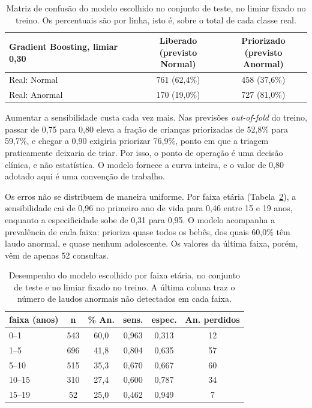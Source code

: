 \documentclass[conference]{IEEEtran}
\begin{document}
\begin{table}[!t]
\caption{Matriz de confusão do modelo escolhido no conjunto de teste, no limiar fixado no treino. Os percentuais são por linha, isto é, sobre o total de cada classe real.}
\label{tab:confusao}
\centering
\footnotesize
\begin{tabular}{>{\raggedright\arraybackslash}p{2.3cm}cc}
\toprule
Gradient Boosting, limiar 0,30 & \shortstack{Liberado\\(previsto Normal)} & \shortstack{Priorizado\\(previsto Anormal)} \\
\midrule
Real: Normal & 761 (62,4\%) & 458 (37,6\%) \\
Real: Anormal & 170 (19,0\%) & 727 (81,0\%) \\
\bottomrule
\end{tabular}
\end{table}

Aumentar a sensibilidade custa cada vez mais. Nas previsões \textit{out-of-fold} do treino, passar de 0,75 para 0,80 eleva a fração de crianças priorizadas de 52,8\% para 59,7\%, e chegar a 0,90 exigiria priorizar 76,9\%, ponto em que a triagem praticamente deixaria de triar. Por isso, o ponto de operação é uma decisão clínica, e não estatística. O modelo fornece a curva inteira, e o valor de 0,80 adotado aqui é uma convenção de trabalho.

Os erros não se distribuem de maneira uniforme. Por faixa etária (Tabela~\ref{tab:faixa}), a sensibilidade cai de 0,96 no primeiro ano de vida para 0,46 entre 15 e 19 anos, enquanto a especificidade sobe de 0,31 para 0,95. O modelo acompanha a prevalência de cada faixa: prioriza quase todos os bebês, dos quais 60,0\% têm laudo anormal, e quase nenhum adolescente. Os valores da última faixa, porém, vêm de apenas 52 consultas.

\begin{table}[!t]
\caption{Desempenho do modelo escolhido por faixa etária, no conjunto de teste e no limiar fixado no treino. A última coluna traz o número de laudos anormais não detectados em cada faixa.}
\label{tab:faixa}
\centering
\footnotesize
\begin{tabular}{lccccc}
\toprule
faixa (anos) & n & \% An. & sens. & espec. & An. perdidos \\
\midrule
0--1 & 543 & 60,0 & 0,963 & 0,313 & 12 \\
1--5 & 696 & 41,8 & 0,804 & 0,635 & 57 \\
5--10 & 515 & 35,3 & 0,670 & 0,667 & 60 \\
10--15 & 310 & 27,4 & 0,600 & 0,787 & 34 \\
15--19 & 52 & 25,0 & 0,462 & 0,949 & 7 \\
\bottomrule
\end{tabular}
\end{table}
\end{document}
